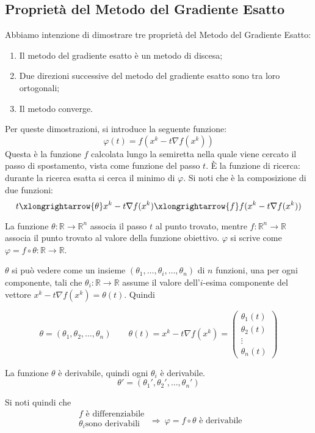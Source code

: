\subsection{Propriet\`a del Metodo del Gradiente Esatto} Abbiamo
intenzione di dimostrare tre propriet\`a del Metodo del Gradiente
Esatto:
\begin{enumerate}
\item Il metodo del gradiente esatto \`e un metodo di discesa;
\item Due direzioni successive del metodo del gradiente esatto sono
tra loro ortogonali;
\item Il metodo converge.
\end{enumerate}

Per queste dimostrazioni, si introduce la seguente funzione:
$$\varphi(t) = f(x^{k} - t \nabla f(x^{k}))$$
Questa \`e la funzione $f$ calcolata lungo la semiretta nella quale
viene cercato il passo di spostamento, vista come funzione del passo
$t$. \`E la funzione di ricerca: durante la ricerca esatta si cerca il
minimo di $\varphi$. Si noti che \`e la composizione di due funzioni:
$$ t \xlongrightarrow{\theta} x^{k}-t\nabla f(x^{k}) \xlongrightarrow{f} f(x^{k} - t \nabla f(x^{k}))$$

La funzione $\theta: \mathbb{R} \rightarrow \mathbb{R}^{n}$ associa il
passo $t$ al punto trovato, mentre $f: \mathbb{R}^{n} \rightarrow
\mathbb{R}$ associa il punto trovato al valore della funzione
obiettivo. $\varphi$ si scrive come $ \varphi= f \circ \theta :
\mathbb{R} \rightarrow \mathbb{R}$.

$\theta$ si può vedere come un insieme $(\theta_{1}, \ldots,
\theta_{i}, \ldots, \theta_{n})$ di $n$ funzioni, una per ogni
componente, tali che $\theta_{i}: \mathbb{R} \rightarrow \mathbb{R}$
assume il valore dell'$i$-esima componente del vettore $x^{k}-t\nabla
f(x^{k}) = \theta(t)$. Quindi

$$ \theta = (\theta_{1}, \theta_{2}, \ldots, \theta_{n}) \qquad \theta(t) = x^{k}-t\nabla f(x^{k}) =  \left(\begin{matrix}\theta_{1}(t) \\\theta_{2}(t) \\ \vdots \\ \theta_{n}(t)\end{matrix}\right)$$

La funzione $\theta$ \`e derivabile, quindi ogni $\theta_i$ \`e
derivabile.
$$ \theta' = (\theta_1', \theta_2', \ldots, \theta_{n}' )$$

Si noti quindi che
$$
\left.\begin{matrix} f \text{ \`e differenziabile}\\ \theta_i \text{
sono derivabili} \\
\end{matrix}\right. ~ \Longrightarrow ~ \varphi = f \circ \theta
\text{ \`e derivabile}
$$

